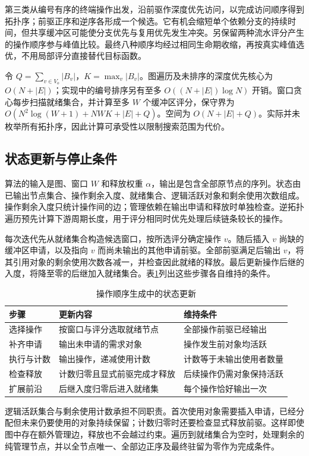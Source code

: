 第三类从编号有序的终端操作出发，沿前驱作深度优先访问，以完成访问顺序得到拓扑序；前驱正序和逆序各形成一个候选。它有机会缩短单个依赖分支的持续时间，但共享缓冲区可能使分支优先与复用优先发生冲突。另保留两种流水评分产生的操作顺序参与峰值比较。最终八种顺序均经过相同生命期收缩，再按真实峰值选优，不用局部评分直接替代目标函数。

令 $Q=\sum_{v\in V_o}|B_v|$，$K=\max_v|B_v|$。图遍历及未排序的深度优先核心为 $O(N+|E|)$；实现中的编号排序另有至多 $O((N+|E|)\log N)$ 开销。窗口贪心每步扫描就绪集合，并计算至多 $W$ 个缓冲区评分，保守界为 $O(N^2\log(W+1)+NWK+|E|+Q)$。空间为 $O(N+|E|+Q)$。实际并未枚举所有拓扑序，因此计算可承受性以限制搜索范围为代价。

\subsection{状态更新与停止条件}
算法的输入是图、窗口 $W$ 和释放权重 $\alpha$，输出是包含全部原节点的序列。状态由已输出节点集合、操作剩余入度、就绪集合、逻辑活跃对象和剩余使用次数组成。操作剩余入度只统计操作间的边；管理依赖在输出申请和释放时单独检查。逆拓扑遍历预先计算下游周期长度，用于评分相同时优先处理后续链条较长的操作。

每次迭代先从就绪集合构造候选窗口，按所选评分确定操作 $v$。随后插入 $v$ 尚缺的缓冲区申请，以及指向 $v$ 而尚未输出的其他申请前驱。全部前驱满足后输出 $v$，将其引用对象的剩余使用次数各减一，并检查因此就绪的释放。最后更新操作后继的入度，将降至零的后继加入就绪集合。表\ref{tab:q1steps}列出这些步骤各自维持的条件。
\begin{table}[H]\centering\small
\caption{操作顺序生成中的状态更新}\label{tab:q1steps}
\begin{tabular}{p{.18\linewidth}p{.36\linewidth}p{.34\linewidth}}\toprule
步骤&更新内容&维持条件\\\midrule
选择操作&按窗口与评分选取就绪节点&全部操作前驱已经输出\\
补齐申请&输出未申请的需求对象&操作发生前对象均活跃\\
执行与计数&输出操作，递减使用计数&计数等于未输出使用者数量\\
检查释放&计数归零且显式前驱完成才释放&后续操作仍需对象保持活跃\\
扩展前沿&后继入度归零后进入就绪集&每个操作恰好输出一次\\\bottomrule
\end{tabular}\end{table}

逻辑活跃集合与剩余使用计数承担不同职责。首次使用对象需要插入申请，已经分配但未来仍要使用的对象持续保留；计数归零时还要检查显式释放前驱。这样即使图中存在额外管理边，释放也不会越过约束。遍历到就绪集合为空时，处理剩余的纯管理节点，并以全节点唯一、全部边正序及最终驻留为零作为完成条件。

